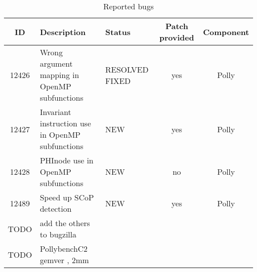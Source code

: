 \begin{table}[htbp]
  \caption{Reported bugs}
  \begin{tabularx}{0.9\textwidth}{ c | X | p{2cm} | c | c }
   ID & Description & Status & Patch provided  & Component \\
  \hline \hline
  12426 & Wrong argument mapping in OpenMP subfunctions & RESOLVED FIXED & yes & Polly \\
   \hline
  12427 & Invariant instruction use in OpenMP subfunctions & NEW & yes & Polly \\
   \hline
  12428 & PHInode use in OpenMP subfunctions & NEW & no & Polly \\
   \hline
  12489 & Speed up SCoP detection & NEW & yes & Polly \\
  TODO & add the others to bugzilla & & & \\
  TODO & PollybenchC2 gemver , 2mm & & & \\
  \end{tabularx}
  \label{tab:bugreports}
\end{table}
